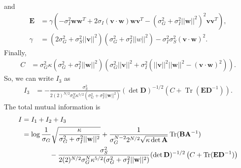 \documentclass[11pt]{article}
\DeclareMathOperator{\Tr}{Tr}
\begin{document}
and
\begin{align}
	\mathbf{E} &= \gamma \left(-\sigma_I^2 \mathbf{ww}^T+ 2\sigma_I (\mathbf{v} \cdot \mathbf{w})\mathbf{wv}^T -(\sigma_G^2 + \sigma_I^2 ||\mathbf{w}||^2)^2 \mathbf{vv}^T\right),\\
	\gamma &= (2\sigma_G^2 + \sigma_S^2 ||\mathbf{v}||^2)(\sigma_G^2 + \sigma_I^2 ||w||^2) - \sigma_I^2 \sigma_S^2 (\mathbf{v}\cdot \mathbf{w})^2.
\end{align}
Finally,
\begin{align}
	C &= \sigma_G^2 \kappa (\sigma_G^2 + \sigma_I^2 ||\mathbf{w}||^2)(\sigma_G^2 ||\mathbf{v}||^2 + \sigma_I^2(||\mathbf{v}||^2 ||\mathbf{w}||^2 - (\mathbf{v}\cdot \mathbf{w})^2)).
\end{align}
So, we can write $I_3$ as 
\begin{align}
	I_3 &= -\frac{\sigma_S^2}{2(2)^{N/2} \sigma_G^N \kappa^{5/2} (\sigma_G^2 + \sigma_I^2 ||\mathbf{w}||^2)}(\det \mathbf{D})^{-1/2} \left(C + \Tr (\mathbf{E}\mathbf{D}^{-1})\right).
\end{align}
The total mutual information is
\begin{align}
	I &= I_1 + I_2 + I_3 \\
	&= \log \frac{1}{\sigma_G} \sqrt{\frac{\kappa}{\sigma_G^2 + \sigma_I^2 ||\mathbf{w}||^2}} +\frac{1}{\sigma_G^{N-2} 2^{N/2} \sqrt{\kappa \det \mathbf{A}}}\Tr(\mathbf{B} \mathbf{A}^{-1}) \notag \\
	&\qquad \qquad -\frac{\sigma_S^2}{2(2)^{N/2} \sigma_G^N \kappa^{5/2} (\sigma_G^2 + \sigma_I^2 ||\mathbf{w}||^2)}(\det \mathbf{D})^{-1/2} \left(C + \Tr (\mathbf{E}\mathbf{D}^{-1})\right)
\end{align}
\end{document}
